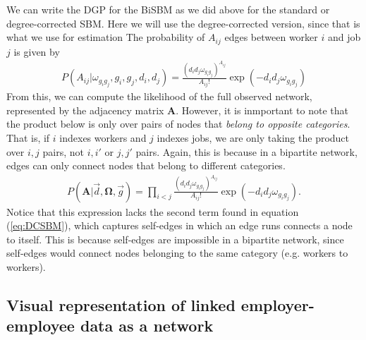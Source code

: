 \documentclass[12pt]{article}
\theoremstyle{definition}
\theoremstyle{plain}
\begin{document}
We can write the DGP for the BiSBM as we did above for the standard or degree-corrected SBM. Here we will use the degree-corrected version, since that is what we use for estimation The probability of $A_{ij}$ edges between worker $i$ and job $j$ is given by
\begin{align*}
P(A_{ij}|\omega_{g_ig_j}, g_i, g_j, d_i, d_j) =\frac{(d_id_j\omega_{g_ig_j})^{A_{ij}}}{A_{ij}!} \exp \left( -d_id_j\omega_{g_ig_j}\right)
\end{align*}
From this, we can compute the likelihood of the full observed network, represented by the adjacency matrix $\mathbf{A}$. However, it is inmportant to note that the product below is only over pairs of nodes that \emph{belong to opposite categories}. That is, if $i$ indexes workers and $j$ indexes jobs, we are only taking the product over $i,j$ pairs, not $i,i'$ or $j,j'$ pairs. Again, this is because in a bipartite network, edges can only connect nodes that belong to different categories. 
\begin{align}
P(\mathbf{A}|\vec{d}, \mathbf{\Omega}, \vec{g}) = \prod_{i < j} \frac{(d_id_j\omega_{g_ig_j})^{A_{ij}}}{A_{ij}!} \exp \left( -d_id_j\omega_{g_ig_j}\right). 
\end{align}
Notice that this expression lacks the second term found in equation (\ref{eq:DCSBM}), which captures self-edges in which an edge runs connects a node to itself. This is because self-edges are impossible in a bipartite network, since self-edges would connect nodes belonging to the same category (e.g. workers to workers).




\clearpage

\subsection{Visual representation of linked employer-employee data as a network}
\end{document}
